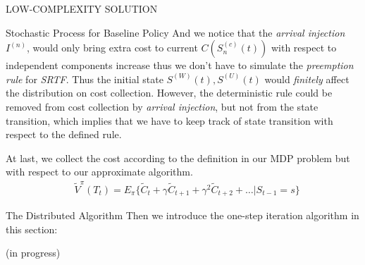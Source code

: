 \documentclass[10pt, conference, letterpaper]{IEEEtran}
\begin{document}
\begin{section}{LOW-COMPLEXITY SOLUTION}
\begin{subsection}{Stochastic Process for Baseline Policy}
            And we notice that the \emph{arrival injection} $I^{(n)}$, would only bring extra cost to current $C(S^{(c)}_{n}(t))$ with respect to independent components increase thus we don't have to simulate the \emph{preemption rule} for \emph{SRTF}. Thus the initial state $S^{(W)}(t), S^{(U)}(t)$ would \emph{finitely} affect the distribution on cost collection. However, the deterministic rule could be removed from cost collection by \emph{arrival injection}, but not from the state transition, which implies that we have to keep track of state transition with respect to the defined rule.

            At last, we collect the cost according to the definition in our MDP problem but with respect to our approximate algorithm.
            \begin{align}
                & \tilde{V}^{\pi}(T_t)
                \nonumber%
                = E_{\pi} \{ \tilde{C}_{t} + \gamma \tilde{C}_{t+1} + \gamma^2 \tilde{C}_{t+2} + \dots |S_{t-1}=s \}
            \end{align}
        \end{subsection}

        \begin{subsection}{The Distributed Algorithm}
            Then we introduce the one-step iteration algorithm in this section:
            \begin{algorithm}[H]
                \caption{Distributed Algorithm for $k$-th AP}
                \begin{algorithmic}
                    \WHILE{\TRUE}
                        \STATE (in progress)
                    \ENDWHILE
                \end{algorithmic}
            \end{algorithm}
        \end{subsection}
        
    \end{section}
\end{document}
